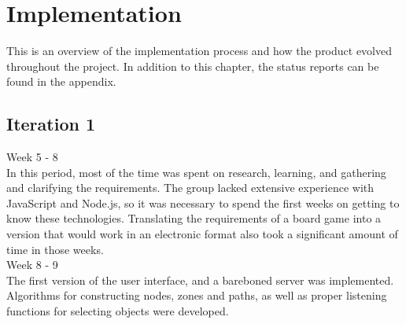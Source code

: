 \chapter{Implementation}

This is an overview of the implementation process and how the product evolved throughout the project. In addition to this chapter, the status reports can be found in the appendix. \\

\section{Iteration 1}

Week 5 - 8\\
\newline
In this period, most of the time was spent on research, learning, and gathering and clarifying the requirements. The group lacked extensive experience with JavaScript and Node.js, so it was necessary to spend the first weeks on getting to know these technologies. Translating the requirements of a board game into a version that would work in an electronic format also took a significant amount of time in those weeks.\\
\newline
Week 8 - 9\\
\newline
The first version of the user interface, and a bareboned server was implemented. Algorithms for constructing nodes, zones and paths, as well as proper listening functions for selecting objects were developed.\\

